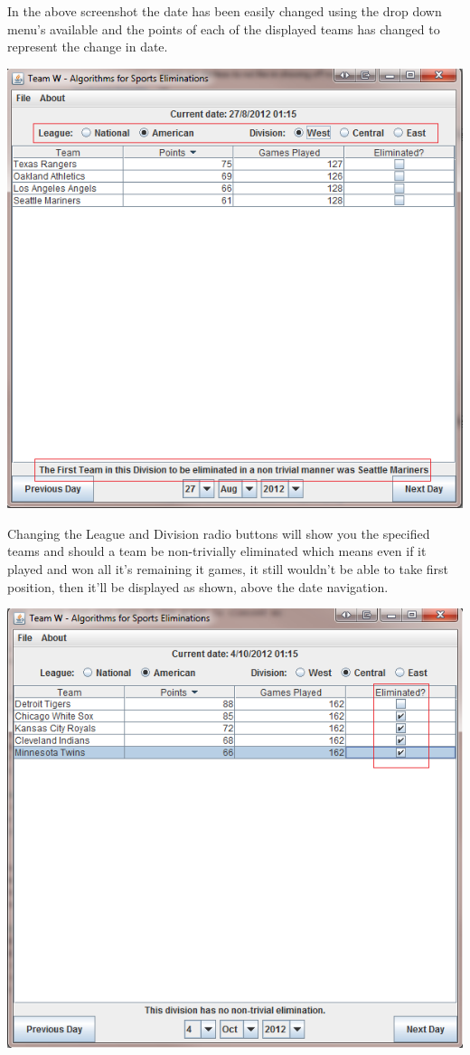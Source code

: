 In the above screenshot the date has been easily changed using the drop down menu's available and the points of each of the displayed teams has changed to represent the change in date.

\includegraphics[width=\linewidth,keepaspectratio]{images/userManualDesk3.png}

Changing the League and Division radio buttons will show you the specified teams and should a team be non-trivially eliminated which means even if it played and won all it's remaining it games, it still wouldn't be able to take first position, then it'll be displayed as shown, above the date navigation.

\includegraphics[width=\linewidth,keepaspectratio]{images/userManualDesk4.png}

